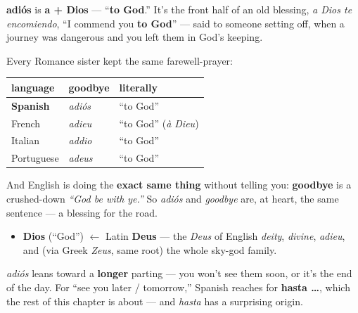 \begin{cousinweb}
\textbf{adiós} is \textbf{a + Dios} — \textquotedblleft{}\textbf{to God}.\textquotedblright{} It's the front half of an old blessing, \emph{a Dios te encomiendo}, \textquotedblleft{}I commend you \textbf{to God}\textquotedblright{} — said to someone setting off, when a journey was dangerous and you left them in God's keeping.

Every Romance sister kept the same farewell-prayer:

\noindent
\begin{tabularx}{\linewidth}{@{}>{\raggedright\arraybackslash}X>{\raggedright\arraybackslash}X>{\raggedright\arraybackslash}X@{}}
\toprule
\textbf{language} & \textbf{goodbye} & \textbf{literally} \\
\midrule
\textbf{Spanish} & \emph{adiós} & \textquotedblleft{}to God\textquotedblright{} \\
French & \emph{adieu} & \textquotedblleft{}to God\textquotedblright{} (\emph{à Dieu}) \\
Italian & \emph{addio} & \textquotedblleft{}to God\textquotedblright{} \\
Portuguese & \emph{adeus} & \textquotedblleft{}to God\textquotedblright{} \\
\bottomrule
\end{tabularx}

And English is doing the \textbf{exact same thing} without telling you: \textbf{goodbye} is a crushed-down \emph{\textquotedblleft{}God be with ye.\textquotedblright{}} So \emph{adiós} and \emph{goodbye} are, at heart, the same sentence — a blessing for the road.

\begin{itemize}
\raggedright
  \item \textbf{Dios} (\textquotedblleft{}God\textquotedblright{}) $\leftarrow$ Latin \textbf{Deus} — the \emph{Deus} of English \emph{deity}, \emph{divine}, \emph{adieu}, and (via Greek \emph{Zeus}, same root) the whole sky-god family.
\end{itemize}
\end{cousinweb}

\begin{grammarlens}[title={Grammar Lens: adiós is a \emph{final} goodbye}]
\emph{adiós} leans toward a \textbf{longer} parting — you won't see them soon, or it's the end of the day. For \textquotedblleft{}see you later / tomorrow,\textquotedblright{} Spanish reaches for \textbf{hasta …}, which the rest of this chapter is about — and \emph{hasta} has a surprising origin.
\end{grammarlens}

